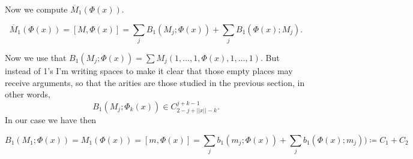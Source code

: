 \documentclass[twoside]{article}
\begin{document}
%
%
%
%
%
%
%
%
%
%

Now we compute $\overline{M}_1(\Phi(x))$.

\begin{equation}\label{eme}
\overline{M}_1(\Phi(x))=[M,\Phi(x)]=\sum_j B_1(M_j;\Phi(x))+\sum_j B_1(\Phi(x);M_j).
\end{equation}

Now we use that $B_1(M_j;\Phi(x))=\sum M_j(1,\dots, 1,\Phi(x),1,\dots, 1)$. But instead of 1's I'm writing spaces to make it clear that those empty places may receive arguments, so that the arities are those studied in the previous section, in other words, $$B_1(M_j;\Phi_k(x))\in C^{j+k-1}_{2-j+||x||-k}.$$ In our case we have then

$$
B_1(M_1;\Phi(x))=M_1(\Phi(x))=[m,\Phi(x)]=\sum_j b_1(m_j;\Phi(x))+\sum_j b_1(\Phi(x);m_j))\coloneqq C_1+C_2
$$
\end{document}
